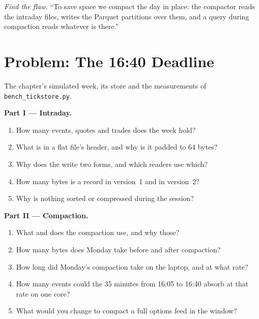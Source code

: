 \begin{exercise}[$\star\star\star$]\label{exo:pl:a-tick-store-on-open-formats:8}
\emph{Find the flaw.} ``To save space we compact the day in place: the compactor reads the intraday files, writes the Parquet
partitions over them, and a query during compaction reads whatever is there.''
\end{exercise}

\section{Problem: The 16:40 Deadline}

\begin{problem}\label{pb:pl:a-tick-store-on-open-formats:1}
The chapter's simulated week, its store and the measurements of \texttt{bench\_tickstore.py}.

\medskip\noindent\textbf{Part I --- Intraday.}
\begin{enumerate}
\item How many events, quotes and trades does the week hold?
\item What is in a flat file's header, and why is it padded to 64 bytes?
\item Why does the  write two forms, and which readers use which?
\item How many bytes is a record in version~1 and in version~2?
\item Why is nothing sorted or compressed during the session?
\end{enumerate}

\medskip\noindent\textbf{Part II --- Compaction.}
\begin{enumerate}[resume]
\item What  and  does the compaction use, and why those?
\item How many bytes does Monday take before and after compaction?
\item How long did Monday's compaction take on the laptop, and at what rate?
\item How many events could the 35 minutes from 16:05 to 16:40 absorb at that rate on one core?
\item What would you change to compact a full options feed in the window?
\end{enumerate}


\end{problem}
